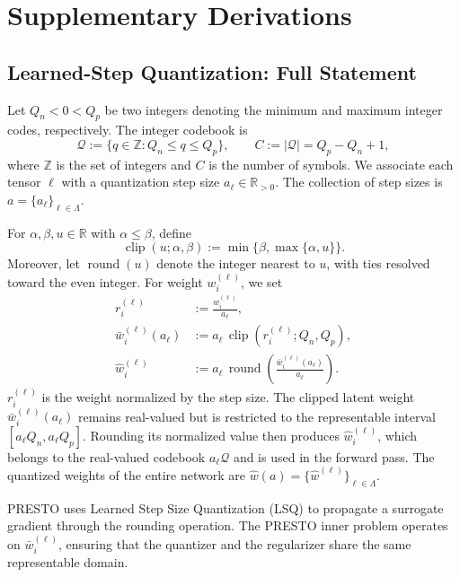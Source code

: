 \documentclass{article}
\begin{document}
\section{Supplementary Derivations}
\label{app:derivations}
\label{app:supplementary}

\subsection{Learned-Step Quantization: Full Statement}
\label{app:lsq-details}
\label{sec:quantizer}

Let $Q_n<0<Q_p$ be two integers denoting the minimum and maximum integer codes,
respectively. The integer codebook is
\[
  \mathcal Q:=\{q\in\mathbb Z:Q_n\leq q\leq Q_p\},
  \qquad
  C:=|\mathcal Q|=Q_p-Q_n+1,
\]
where $\mathbb Z$ is the set of integers and $C$ is the number of symbols. We
associate each tensor $\ell$ with a quantization step size
$a_\ell\in\mathbb R_{>0}$. The collection of step sizes is
$a=\{a_\ell\}_{\ell\in\Lambda}$.

For $\alpha,\beta,u\in\mathbb R$ with $\alpha\leq\beta$, define
\[
  \operatorname{clip}(u;\alpha,\beta)
  :=\min\{\beta,\max\{\alpha,u\}\}.
\]
Moreover, let $\operatorname{round}(u)$ denote the integer nearest to $u$,
with ties resolved toward the even integer. For weight
$w_i^{(\ell)}$, we set
\begin{align}
  r_i^{(\ell)}
  &:=\frac{w_i^{(\ell)}}{a_\ell},
  \label{eq:normalized-weight}\\
  \bar w_i^{(\ell)}(a_\ell)
  &:=
  a_\ell\,
  \operatorname{clip}\!\left(
    r_i^{(\ell)};Q_n,Q_p
  \right),
  \label{eq:clipped-latent}\\
  \widehat w_i^{(\ell)}
  &:=
  a_\ell\,
  \operatorname{round}\!\left(
    \frac{\bar w_i^{(\ell)}(a_\ell)}{a_\ell}
  \right).
  \label{eq:quantizer}
\end{align}
$r_i^{(\ell)}$ is the weight normalized by the step size. The clipped latent
weight $\bar w_i^{(\ell)}(a_\ell)$ remains real-valued but is restricted to the
representable interval $[a_\ell Q_n,a_\ell Q_p]$. Rounding its normalized value
then produces $\widehat w_i^{(\ell)}$, which belongs to the real-valued codebook
$a_\ell\mathcal Q$ and is used in the forward pass.
The quantized weights of the entire network are
$\widehat w(a)=\{\widehat w^{(\ell)}\}_{\ell\in\Lambda}$.

PRESTO uses Learned Step Size Quantization (LSQ) \citep{esser2020lsq} to
propagate a surrogate gradient through the rounding operation. The PRESTO inner
problem operates on $\bar w_i^{(\ell)}$, ensuring that the quantizer and the
regularizer share the same representable domain.
\end{document}
